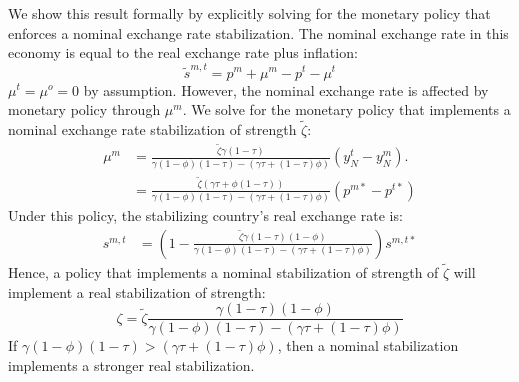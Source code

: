 We show this result formally by explicitly solving for the monetary
policy that enforces a nominal exchange rate stabilization. The
nominal exchange rate in this economy is equal to the real exchange
rate plus inflation:
\begin{equation*}
  \tilde{s}^{m, t} = p^m + \mu^m - p^t - \mu^t
\end{equation*}
$\mu^t =\mu^o= 0$ by assumption. However, the nominal exchange rate is
affected by monetary policy through $\mu^m$. We solve for the monetary
policy that implements a nominal exchange rate stabilization of
strength $\tilde \zeta$:
\begin{align}
  \mu^m
  & = \frac{\tilde \zeta \gamma (1 - \tau)}{\gamma (1 - \phi)(1 - \tau)
    - (\gamma \tau + (1 - \tau) \phi)}
    \left( y^t_N - y^m_N \right). \\
  & =\frac{\tilde \zeta \left( \gamma \tau + \phi (1 - \tau) \right)}
    {\gamma (1 - \phi)(1 - \tau) - (\gamma \tau + (1 - \tau) \phi)}
    \left( p^{m \ast} - p^{t \ast} \right)
\end{align}
Under this policy, the stabilizing country's real exchange rate is:
\begin{align*}
  s^{m, t}
  & = \left(
    1 - \frac{\tilde{\zeta} \gamma (1 - \tau)(1 - \phi)}
    {\gamma (1 - \phi)(1 - \tau) - (\gamma \tau + (1 - \tau) \phi)}
    \right)
    s^{m, t \ast} 
\end{align*}
Hence, a policy that implements a nominal stabilization of strength of
$\tilde{\zeta}$ will implement a real stabilization of strength:
\begin{equation*}
  \zeta =\tilde{\zeta} \frac{\gamma (1 - \tau)(1 - \phi)}
  {\gamma (1 - \phi)(1 - \tau) - (\gamma \tau + (1 - \tau) \phi)} 
\end{equation*}
If $\gamma (1 - \phi)(1 - \tau) > (\gamma \tau + (1 - \tau) \phi)$,
then a nominal stabilization implements a stronger real stabilization.


